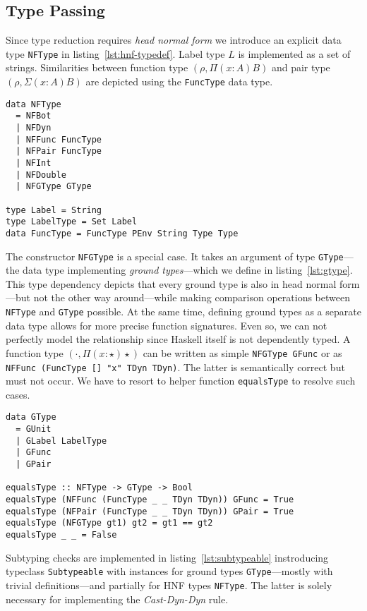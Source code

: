 \subsection{Type Passing}

Since type reduction requires \emph{head normal form} we introduce an explicit data type \texttt{NFType} in listing~\ref{lst:hnf-typedef}. Label type $L$ is implemented as a set of strings. Similarities between function type $(\rho, \Pi(x:A)B)$ and pair type $(\rho, \Sigma(x:A)B)$ are  depicted using the \texttt{FuncType} data type.

\begin{lstlisting}[float,
  label=lst:hnf-typedef,
  caption=HNF type definition (\texttt{ProcessEnvironment.hs})]
data NFType
  = NFBot
  | NFDyn
  | NFFunc FuncType
  | NFPair FuncType
  | NFInt
  | NFDouble
  | NFGType GType

type Label = String
type LabelType = Set Label
data FuncType = FuncType PEnv String Type Type
\end{lstlisting}

The constructor \texttt{NFGType} is a special case. It takes an argument of type \texttt{GType}---the data type implementing \emph{ground types}---which we define in listing~\ref{lst:gtype}. This type dependency depicts that every ground type is also in head normal form---but not the other way around---while making comparison operations between \texttt{NFType} and \texttt{GType} possible. At the same time, defining ground types as a separate data type allows for more precise function signatures. Even so, we can not perfectly model the relationship since Haskell itself is not dependently typed. A function type $(\cdot, \Pi(x:\star)\star)$ can be written as simple \texttt{NFGType GFunc} or as \texttt{NFFunc (FuncType [] "x" TDyn TDyn)}. The latter is semantically correct but must not occur. We have to resort to helper function \texttt{equalsType} to resolve such cases.

\begin{lstlisting}[float,
  caption=Ground type definition (\texttt{ProcessEnvironment.hs}),
  label=lst:gtype]
data GType
  = GUnit
  | GLabel LabelType
  | GFunc
  | GPair

equalsType :: NFType -> GType -> Bool
equalsType (NFFunc (FuncType _ _ TDyn TDyn)) GFunc = True
equalsType (NFPair (FuncType _ _ TDyn TDyn)) GPair = True
equalsType (NFGType gt1) gt2 = gt1 == gt2
equalsType _ _ = False
\end{lstlisting}

Subtyping checks are implemented in listing~\ref{lst:subtypeable} instroducing typeclass \texttt{Subtypeable} with instances for ground types \texttt{GType}---mostly with trivial definitions---and partially for HNF types \texttt{NFType}. The latter is solely necessary for implementing the \emph{Cast-Dyn-Dyn} rule.

